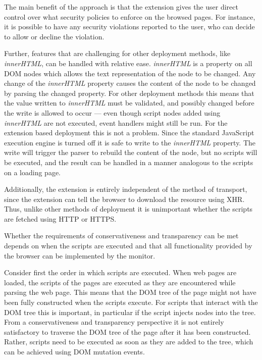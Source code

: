 \documentclass{llncs}
\begin{document}
The main benefit of the approach is that the extension gives the user direct
control over what security policies to enforce on the browsed pages. For
instance, it is possible to have any security violations reported to the user,
who can decide to allow or decline the violation. 

Further, features that are challenging for other deployment methods, like
\emph{innerHTML}, can be handled with relative ease.  \emph{innerHTML} is a
property on all DOM nodes which allows the text representation of the node to
be changed. Any change of the \emph{innerHTML} property causes the content of
the node to be changed by parsing the changed property. For other deployment
methods this means that the value written to \emph{innerHTML} must be
validated, and possibly changed before the write is allowed to occur --- even
though script nodes added using \emph{innerHTML} are not executed, event
handlers might still be run.
%
For the extension based deployment this is not a problem.  Since the standard
JavaScript execution engine is turned off it is safe to write to the
\emph{innerHTML} property. The write will trigger the parser to rebuild the
content of the node, but no scripts will be executed, and the result can be
handled in a manner analogous to the scripts on a loading page.

Additionally, the extension is entirely independent of the method of transport,
since the extension can tell the browser to download the resource using XHR.
Thus, unlike other methods of deployment it is unimportant whether the scripts
are fetched using HTTP or HTTPS.

Whether the requirements of conservativeness and transparency can be met
depends on when the scripts are executed and that all functionality provided by
the browser can be implemented by the monitor.

Consider first the order in which scripts are executed.  When web pages are
loaded, the scripts of the pages are executed as they are encountered while
parsing the web page. This means that the DOM tree of the page might not have
been fully constructed when the scripts execute.  For scripts that interact
with the DOM tree this is important, in particular if the script injects nodes
into the tree. From a conservativeness and transparency perspective it is not
entirely satisfactory to traverse the DOM tree of the page after it has been
constructed.  Rather, scripts need to be executed as soon as they are added to
the tree, which can be achieved using DOM mutation events.
\end{document}
